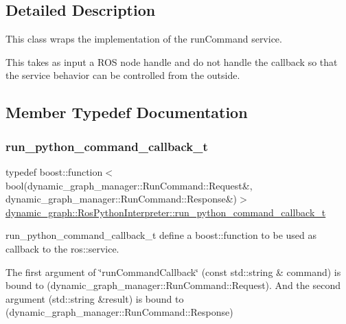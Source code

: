 \subsection{Detailed Description}
This class wraps the implementation of the run\+Command service. 

This takes as input a R\+OS node handle and do not handle the callback so that the service behavior can be controlled from the outside. 

\subsection{Member Typedef Documentation}
\mbox{\label{classdynamic__graph_1_1RosPythonInterpreter_a4ae104e908148e26f0d9c46357ecaf89}} 
\subsubsection{\texorpdfstring{run\+\_\+python\+\_\+command\+\_\+callback\+\_\+t}{run\_python\_command\_callback\_t}}
{\footnotesize\ttfamily typedef boost\+::function$<$bool(dynamic\+\_\+graph\+\_\+manager\+::\+Run\+Command\+::\+Request\&, dynamic\+\_\+graph\+\_\+manager\+::\+Run\+Command\+::\+Response\&)$>$ \hyperlink{classdynamic__graph_1_1RosPythonInterpreter_a4ae104e908148e26f0d9c46357ecaf89}{dynamic\+\_\+graph\+::\+Ros\+Python\+Interpreter\+::run\+\_\+python\+\_\+command\+\_\+callback\+\_\+t}}



run\+\_\+python\+\_\+command\+\_\+callback\+\_\+t define a boost\+::function to be used as callback to the ros\+::service. 

The first argument of \char`\"{}run\+Command\+Callback\char`\"{} (const std\+::string \& command) is bound to (dynamic\+\_\+graph\+\_\+manager\+::\+Run\+Command\+::\+Request). And the second argument (std\+::string \&result) is bound to (dynamic\+\_\+graph\+\_\+manager\+::\+Run\+Command\+::\+Response) \mbox{\label{classdynamic__graph_1_1RosPythonInterpreter_a7beecaa90bafc03798fd907da9690654}} 
